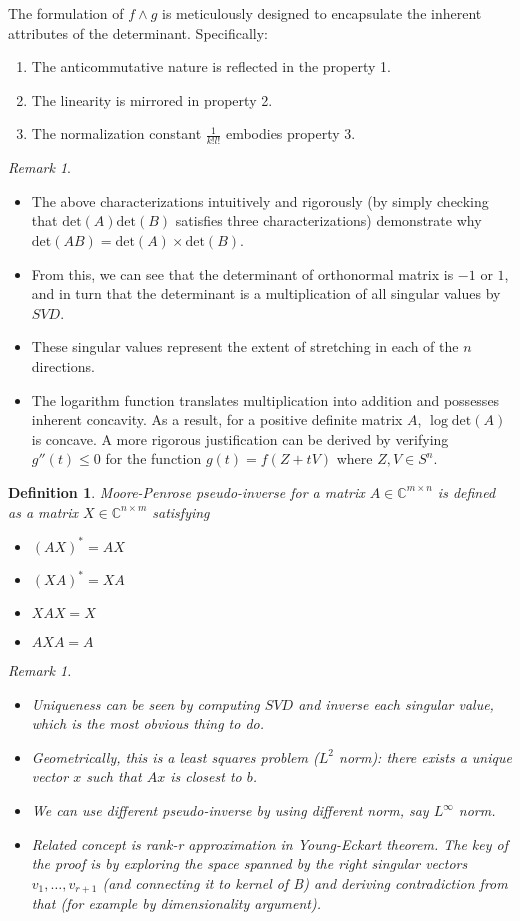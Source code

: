 \documentclass{article}
\newtheorem{definition}{Definition}
\theoremstyle{remark}
\newtheorem{remark}[example]{Remark}
\begin{document}
  The formulation of $f\wedge g$ is meticulously designed to 
  encapsulate the inherent attributes of the determinant. Specifically:
  \begin{enumerate}
    \item The anticommutative nature is reflected in the property 1.
    \item The linearity is mirrored in property 2.
    \item The normalization constant $\frac{1}{k!l!}$ embodies property 3.
  \end{enumerate}
\begin{remark}
\begin{itemize}
 \item The above characterizations intuitively and rigorously (by simply checking that $\text{det}(A)\text{det}(B)$ satisfies three characterizations) demonstrate why $ \text{det}(AB) = \text{det}(A) \times \text{det}(B) $.
 \item From this, we can see that the determinant of orthonormal matrix is $-1$ or $1$, and in turn that the determinant is a multiplication of all singular values by $SVD$.
 \item These singular values represent the extent of stretching in each of the \( n \) directions.
 \item The logarithm function translates multiplication into addition and possesses inherent concavity. As a result, for a positive definite matrix \( A \), \( \log \text{det}(A) \) is concave. A more rigorous justification can be derived by verifying \( g''(t) \leq 0 \) for 
 the function \( g(t) = f(Z + tV) \) where \( Z, V \in S^n \).
\end{itemize}
\end{remark}
\begin{definition}
Moore-Penrose pseudo-inverse for a matrix $A\in \mathbb{C}^{m\times n}$ is defined as a matrix $X\in\mathbb{C}^{n\times m}$ satisfying
\begin{itemize}
\item $(AX)^*=AX$
\item $(XA)^* = XA$
\item $XAX=X$
\item $AXA=A$
\end{itemize}
\begin{remark}
\begin{itemize}
\item Uniqueness can be seen by computing $SVD$ and inverse each singular value, which is the most obvious thing to do.
\item Geometrically, this is a least squares problem ($L^2$ norm): there exists a unique vector $x$ such that $Ax$ is closest to $b$.
\item We can use different pseudo-inverse by using different norm, say $L^\infty$ norm.
\item Related concept is rank-r approximation in Young-Eckart theorem. The key of the proof is by exploring the space spanned by the right
 singular vectors $v_1,\dots,v_{r+1}$ (and connecting it to kernel of B) and deriving contradiction from that (for example by dimensionality argument).
\end{itemize}
\end{remark}
\end{definition}
\end{document}
